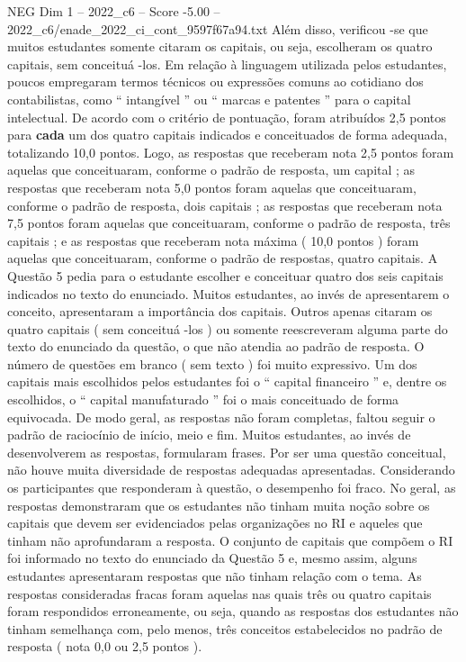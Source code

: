 \begin{textsample}{NEG Dim 1 – 2022\_c6 – Score -5.00 – 2022\_c6/enade\_2022\_ci\_cont\_9597f67a94.txt}
Além disso, verificou -se que muitos estudantes somente citaram os capitais, ou seja, escolheram os quatro capitais, sem conceituá -los.
Em relação à linguagem utilizada pelos estudantes, poucos empregaram termos técnicos ou expressões comuns ao cotidiano dos contabilistas, como “ intangível ” ou “ marcas e patentes ” para o capital intelectual.
De acordo com o critério de pontuação, foram atribuídos 2,5 pontos para \textbf{cada} um dos quatro capitais indicados e conceituados de forma adequada, totalizando 10,0 pontos.
Logo, as respostas que receberam nota 2,5 pontos foram aquelas que conceituaram, conforme o padrão de resposta, um capital ; as respostas que receberam nota 5,0 pontos foram aquelas que conceituaram, conforme o padrão de resposta, dois capitais ; as respostas que receberam nota 7,5 pontos foram aquelas que conceituaram, conforme o padrão de resposta, três capitais ; e as respostas que receberam nota máxima ( 10,0 pontos ) foram aquelas que conceituaram, conforme o padrão de respostas, quatro capitais.
A Questão 5 pedia para o estudante escolher e conceituar quatro dos seis capitais indicados no texto do enunciado.
Muitos estudantes, ao invés de apresentarem o conceito, apresentaram a importância dos capitais.
Outros apenas citaram os quatro capitais ( sem conceituá -los ) ou somente reescreveram alguma parte do texto do enunciado da questão, o que não atendia ao padrão de resposta.
O número de questões em branco ( sem texto ) foi muito expressivo.
Um dos capitais mais escolhidos pelos estudantes foi o “ capital financeiro ” e, dentre os escolhidos, o “ capital manufaturado ” foi o mais conceituado de forma equivocada.
De modo geral, as respostas não foram completas, faltou seguir o padrão de raciocínio de início, meio e fim.
Muitos estudantes, ao invés de desenvolverem as respostas, formularam frases.
Por ser uma questão conceitual, não houve muita diversidade de respostas adequadas apresentadas.
Considerando os participantes que responderam à questão, o desempenho foi fraco.
No geral, as respostas demonstraram que os estudantes não tinham muita noção sobre os capitais que devem ser evidenciados pelas organizações no RI e aqueles que tinham não aprofundaram a resposta.
O conjunto de capitais que compõem o RI foi informado no texto do enunciado da Questão 5 e, mesmo assim, alguns estudantes apresentaram respostas que não tinham relação com o tema.
As respostas consideradas fracas foram aquelas nas quais três ou quatro capitais foram respondidos erroneamente, ou seja, quando as respostas dos estudantes não tinham semelhança com, pelo menos, três conceitos estabelecidos no padrão de resposta ( nota 0,0 ou 2,5 pontos ).

\end{textsample}
